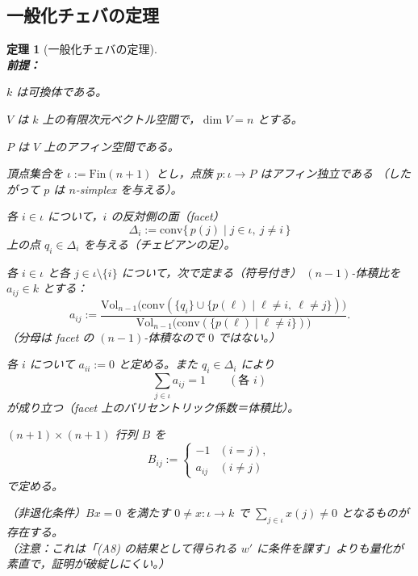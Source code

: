 \documentclass[a4paper,12pt]{bxjsbook}
\newlength{\customindent}
\newenvironment{body}{
  \par
  \begingroup
  \setlength{\leftskip}{\customindent}
  \setlength{\rightskip}{0pt}
  \setlength{\parindent}{1em}
  \setlength{\displayindent}{\customindent}
  \setlength{\displaywidth}{\dimexpr\linewidth-\customindent\relax}
}{
  \par
  \endgroup
}
\theoremstyle{theorem}
\newtheorem{theorem}{定理}[chapter]
\begin{document}
\begin{body}
    \subsection{一般化チェバの定理}
    \begin{theorem}[一般化チェバの定理]
        \noindent\textbf{\\前提：}\par
        \begin{theoremenumerate}[label=(A\arabic*), leftmargin=4em, topsep=2pt, partopsep=0pt, itemsep=0pt, parsep=0pt]
            \item $k$ は可換体である。
            \item $V$ は $k$ 上の有限次元ベクトル空間で，$\dim V=n$ とする。
            \item $P$ は $V$ 上のアフィン空間である。
            \item 頂点集合を $\iota:=\mathrm{Fin}(n+1)$ とし，点族 $p:\iota\to P$ はアフィン独立である
            （したがって $p$ は $n$-simplex を与える）。
            \item 各 $i\in\iota$ について，$i$ の反対側の面（facet）
            \[
            \Delta_i := \mathrm{conv}\{\,p(j)\mid j\in\iota,\ j\neq i\,\}
            \]
            上の点 $q_i\in \Delta_i$ を与える（チェビアンの足）。
            \item 各 $i\in\iota$ と各 $j\in\iota\setminus\{i\}$ について，次で定まる（符号付き）
            $(n-1)$-体積比を $a_{ij}\in k$ とする：
            \[
            a_{ij}
            :=
            \frac{\mathrm{Vol}_{n-1}\big(\mathrm{conv}(\{q_i\}\cup\{p(\ell)\mid \ell\neq i,\ \ell\neq j\})\big)}
            {\mathrm{Vol}_{n-1}\big(\mathrm{conv}(\{p(\ell)\mid \ell\neq i\})\big)}.
            \]
            （分母は facet の $(n-1)$-体積なので $0$ ではない。）
            \item 各 $i$ について $a_{ii}:=0$ と定める。また $q_i\in\Delta_i$ により
            \[
            \sum_{j\in\iota} a_{ij} = 1
            \qquad(\text{各 }i)
            \]
            が成り立つ（facet 上のバリセントリック係数＝体積比）。
            \item $(n+1)\times(n+1)$ 行列 $B$ を
            \[
            B_{ij}:=
            \begin{cases}
                -1 & (i=j),\\
                a_{ij} & (i\neq j)
            \end{cases}
            \]
            で定める。
            \item （非退化条件）$Bx=0$ を満たす $0\neq x:\iota\to k$ で $\sum_{j\in\iota}x(j)\neq 0$ となるものが存在する。
            \\
            \textnormal{（注意：これは「(A8) の結果として得られる $w'$ に条件を課す」よりも量化が素直で，証明が破綻しにくい。）}
        \end{theoremenumerate}


\end{theorem}
\end{body}
\end{document}
